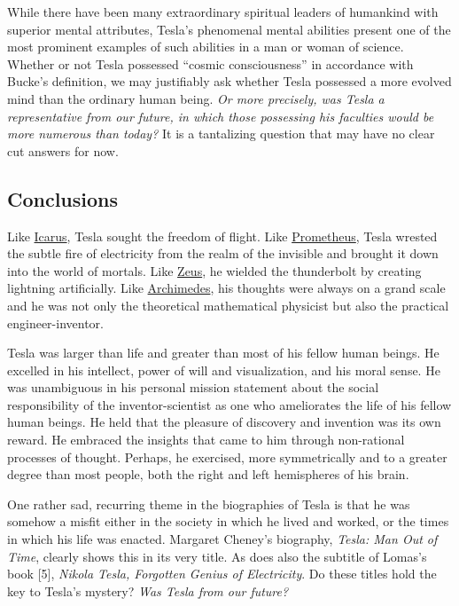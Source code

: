 \documentclass[
  12pt,
  british,
  a4paper,
]{article}
\begin{document}
While there have been many extraordinary spiritual leaders of humankind
with superior mental attributes, Tesla's phenomenal mental abilities
present one of the most prominent examples of such abilities in a man or
woman of science. Whether or not Tesla possessed ``cosmic
consciousness'' in accordance with Bucke's definition, we may
justifiably ask whether Tesla possessed a more evolved mind than the
ordinary human being. \emph{Or more precisely, was Tesla a
representative from our future, in which those possessing his faculties
would be more numerous than today?} It is a tantalizing question that
may have no clear cut answers for now.

\hypertarget{conclusions}{%
\subsection{Conclusions}\label{conclusions}}

Like \href{https://en.wikipedia.org/wiki/Icarus}{Icarus}, Tesla sought
the freedom of flight. Like
\href{https://en.wikipedia.org/wiki/Prometheus}{Prometheus}, Tesla
wrested the subtle fire of electricity from the realm of the invisible
and brought it down into the world of mortals. Like
\href{https://en.wikipedia.org/wiki/Zeus}{Zeus}, he wielded the
thunderbolt by creating lightning artificially. Like
\href{https://en.wikipedia.org/wiki/Archimedes}{Archimedes}, his
thoughts were always on a grand scale and he was not only the
theoretical mathematical physicist but also the practical
engineer-inventor.

Tesla was larger than life and greater than most of his fellow human
beings. He excelled in his intellect, power of will and visualization,
and his moral sense. He was unambiguous in his personal mission
statement about the social responsibility of the inventor-scientist as
one who ameliorates the life of his fellow human beings. He held that
the pleasure of discovery and invention was its own reward. He embraced
the insights that came to him through non-rational processes of thought.
Perhaps, he exercised, more symmetrically and to a greater degree than
most people, both the right and left hemispheres of his brain.

One rather sad, recurring theme in the biographies of Tesla is that he
was somehow a misfit either in the society in which he lived and worked,
or the times in which his life was enacted. Margaret Cheney's biography,
\emph{Tesla: Man Out of Time}, clearly shows this in its very title. As
does also the subtitle of Lomas's book {[}5{]}, \emph{Nikola Tesla,
Forgotten Genius of Electricity}. Do these titles hold the key to
Tesla's mystery? \emph{Was Tesla from our future?}
\end{document}
